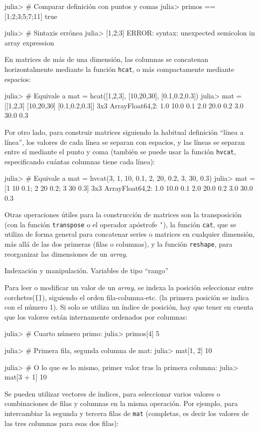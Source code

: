 ﻿\documentclass{article}
\newcommand{\jl}{\texttt}
\begin{document}
julia> # Comparar definición con puntos y comas
julia> primos == [1;2;3;5;7;11]
true

julia> # Sintaxis errónea
julia> [1,2;3]
ERROR: syntax: unexpected semicolon in array expression

En matrices de más de una dimensión, las columnas se concatenan horizontalmente mediante la función \jl{hcat}, o más compactamente mediante espacios:

julia> # Equivale a mat = hcat([1,2,3], [10,20,30], [0.1,0.2,0.3])
julia> mat = [[1,2,3] [10,20,30] [0.1,0.2,0.3]]
3x3 Array{Float64,2}:
 1.0 10.0 0.1
 2.0 20.0 0.2
 3.0 30.0 0.3

Por otro lado, para construir matrices siguiendo la habitual definición ``línea a línea'', los valores de cada línea se separan con espacios, y las líneas se separan entre sí mediante el punto y coma (también se puede usar la función \jl{hvcat}, especificando cuántas columnas tiene cada línea):

julia> # Equivale a mat = hvcat(3, 1, 10, 0.1, 2, 20, 0.2, 3, 30, 0.3)
julia> mat = [1 10 0.1; 2 20 0.2; 3 30 0.3]
3x3 Array{Float64,2}:
 1.0 10.0 0.1
 2.0 20.0 0.2
 3.0 30.0 0.3

Otras operaciones útiles para la construcción de matrices son la transposición (con la función \jl{transpose} o el operador apóstrofe \jl{'}), la función \jl{cat}, que se utiliza de forma general para concatenar series o matrices en cualquier dimensión, más allá de las dos primeras (filas o columnas), y la función \jl{reshape}, para reorganizar las dimensiones de un \emph{array}.

Indexación y manipulación. Variables de tipo ``rango''

Para leer o modificar un valor de un \emph{array}, se indexa la posición seleccionar entre corchetes(\jl{[]}), siguiendo el orden fila-columna-etc. (la primera posición se indica con el número 1). Si solo se utiliza un índice de posición, hay que tener en cuenta que los valores están internamente ordenados por columnas:

julia> # Cuarto número primo:
julia> primos[4]
5

julia> # Primera fila, segunda columna de mat:
julia> mat[1, 2]
10

julia> # O lo que es lo mismo, primer valor tras la primera columna:
julia> mat[3 + 1]
10

Se pueden utilizar vectores de índices, para seleccionar varios valores o combinaciones de filas y columnas en la misma operación. Por ejemplo, para intercambiar la segunda y tercera filas de \jl{mat} (completas, es decir los valores de las tres columnas para esas dos filas):
\end{document}
